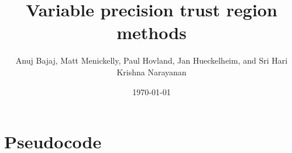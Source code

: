 \documentclass[12pt]{article}
\theoremstyle{definition}
\begin{document}
	\author{Anuj Bajaj, Matt Menickelly, Paul Hovland, Jan Hueckelheim, and Sri Hari \\ Krishna  Narayanan}
	\date{\today}

	\title{Variable precision trust region methods}
	\maketitle
	
      \section{Pseudocode} 
       
     	\begin{algorithm}[t!]
     	
     	\scriptsize
     

\end{algorithm}
\end{document}
